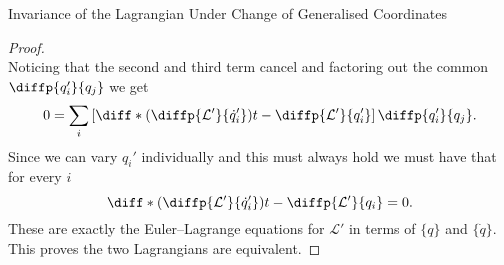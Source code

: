 \documentclass[fleqn]{NotesClass}
\newcommand*{\lagrangian}{\mathcal{L}}
\begin{document}
\begin{thm}{Invariance of the Lagrangian Under Change of Generalised Coordinates}{}
\begin{proof}
\begin{equation}
            \end{equation}
            Noticing that the second and third term cancel and factoring out the common \(\diffp{q_i'}{q_j}\) we get
            \begin{equation}
                0 = \sum_i\left[ \diff*{\left( \diffp{\lagrangian'}{\dot{q}_i'} \right)}{t} - \diffp{\lagrangian'}{q_i'} \right]\diffp{q_i'}{q_j}.
            \end{equation}
            Since we can vary \(q_i'\) individually and this must always hold we must have that for every \(i\)
            \begin{equation}
                \diff*{\left( \diffp{\lagrangian'}{\dot{q}_i'} \right)}{t} - \diffp{\lagrangian'}{q_i} = 0.
            \end{equation}
            These are exactly the Euler--Lagrange equations for \(\lagrangian'\) in terms of \(\{q\}\) and \(\{\dot{q}\}\).
            This proves the two Lagrangians are equivalent.
        \end{proof}
    \end{thm}
    
\end{document}

